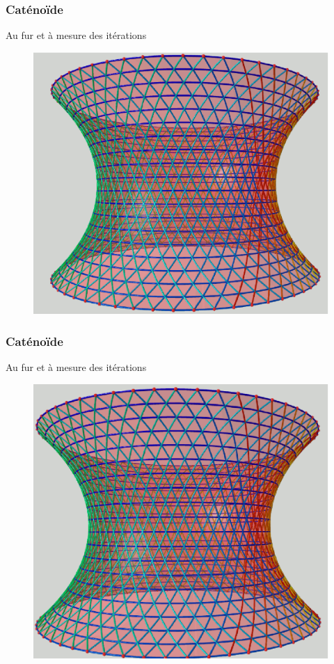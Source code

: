\documentclass{beamer}
\begin{document}
\begin{frame}
\frametitle{Caténoïde}
Au fur et à mesure des itérations
\begin{figure}[h!]
      \centering 
      \includegraphics[scale=0.31]{catenoide/catenoide-7.eps}
\end{figure}
\end{frame}

\begin{frame}
\frametitle{Caténoïde}
Au fur et à mesure des itérations
\begin{figure}[h!]
      \centering 
      \includegraphics[scale=0.31]{catenoide/catenoide-8.eps}
\end{figure}
\end{frame}
\end{document}
